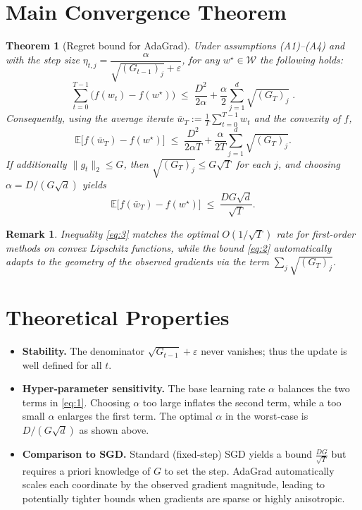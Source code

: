 \documentclass{article}
\newtheorem{theorem}{Theorem}
\newtheorem{remark}{Remark}
\begin{document}
\section*{Main Convergence Theorem}
\begin{theorem}[Regret bound for AdaGrad]\label{thm:regret}
Under assumptions (A1)–(A4) and with the step size
$\eta_{t,j}=\dfrac{\alpha}{\sqrt{(G_{t-1})_j}+\varepsilon}$,
for any $w^\star\in\mathcal{W}$ the following holds:
\[
\sum_{t=0}^{T-1}\bigl(f(w_t)-f(w^\star)\bigr)
\;\le\;
\frac{D^2}{2\alpha}
    +\frac{\alpha}{2}\sum_{j=1}^{d}\sqrt{(G_{T})_j}\; .
\tag{1}
\]
Consequently, using the average iterate
$\bar w_T:=\frac1T\sum_{t=0}^{T-1}w_t$ and the convexity of $f$,
\[
\mathbb{E}\bigl[f(\bar w_T)-f(w^\star)\bigr]
\;\le\;
\frac{D^2}{2\alpha T}
    +\frac{\alpha}{2T}\sum_{j=1}^{d}\sqrt{(G_{T})_j}.
\tag{2}
\]
If additionally $\|g_t\|_2\le G$, then $\sqrt{(G_T)_j}\le G\sqrt{T}$ for each $j$,
and choosing $\alpha = D/(\!G\sqrt{d})$ yields
\[
\mathbb{E}\bigl[f(\bar w_T)-f(w^\star)\bigr]
\;\le\;
\frac{DG\sqrt{d}}{\sqrt{T}} .
\tag{3}
\]
\end{theorem}

\begin{remark}
Inequality \eqref{eq:3} matches the optimal $O(1/\sqrt{T})$ rate for
first‑order methods on convex Lipschitz functions, while the bound
\eqref{eq:2} automatically adapts to the geometry of the observed
gradients via the term $\sum_j\sqrt{(G_T)_j}$.
\end{remark}

\section*{Theoretical Properties}
\begin{itemize}
\item \textbf{Stability.} The denominator $\sqrt{G_{t-1}}+\varepsilon$ never
vanishes; thus the update is well defined for all $t$.
\item \textbf{Hyper‑parameter sensitivity.}
The base learning rate $\alpha$ balances the two terms in \eqref{eq:1}.
Choosing $\alpha$ too large inflates the second term,
while a too small $\alpha$ enlarges the first term.
The optimal $\alpha$ in the worst‑case is $D/(G\sqrt{d})$ as shown above.
\item \textbf{Comparison to SGD.}
Standard (fixed‑step) SGD yields a bound $\frac{DG}{\sqrt{T}}$ but
requires a priori knowledge of $G$ to set the step.
AdaGrad automatically scales each coordinate by the observed
gradient magnitude, leading to potentially tighter bounds when
gradients are sparse or highly anisotropic.
\end{itemize}
\end{document}
